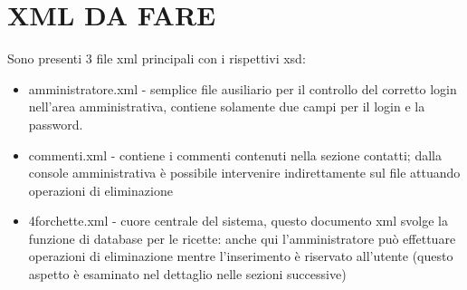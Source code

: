 \documentclass[12pt]{article}
\begin{document}
		\section{XML DA FARE}
		Sono presenti 3 file xml principali con i rispettivi xsd:

		\begin{itemize}
		\item  amministratore.xml - semplice file ausiliario per il controllo del corretto login nell'area amministrativa, contiene solamente due campi per il login e la password.
		
		\item commenti.xml - contiene i commenti contenuti nella sezione contatti; dalla console amministrativa è possibile intervenire indirettamente sul file attuando operazioni di eliminazione
		
		\item 4forchette.xml - cuore centrale del sistema, questo documento xml svolge la funzione di database per le ricette: anche qui l'amministratore può effettuare operazioni di eliminazione mentre l'inserimento è riservato all'utente (questo aspetto \`e esaminato nel dettaglio nelle sezioni successive)
		\end{itemize}				
					
\end{document}
